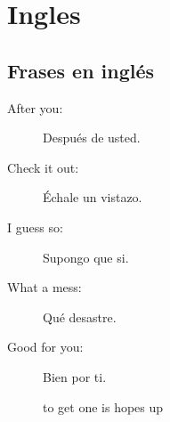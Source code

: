 \part{Ingles}

\chapter{Frases en ingl\'es}

\begin{description}
	\item[After you: ] Despu\'es de usted.
	\item[Check it out: ] \'Echale un vistazo.
	\item[I guess so: ] Supongo que si.
	\item[What a mess: ] Qu\'e desastre.
	\item[Good for you: ] Bien por ti.			
	
	to get one is hopes up 
\end{description}

